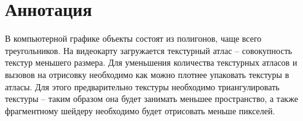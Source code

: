 \documentclass{fefu}
\author{Терехов Д.Е.}
\begin{document}
\makereporttitle
\tableofcontents
\pagebreak
\section*{Аннотация}
В компьютерной графике объекты состоят из полигонов, чаще всего треугольников.
На видеокарту загружается текстурный атлас -- совокупность текстур меньшего размера.
Для уменьшения количества текстурных атласов и вызовов на отрисовку необходимо как можно плотнее упаковать
текстуры в атласы. Для этого предварительно текстуры необходимо триангулировать текстуры -- таким образом
 она будет занимать меньшее пространство, а также фрагментному шейдеру необходимо будет отрисовать меньше пикселей.
\end{document}
